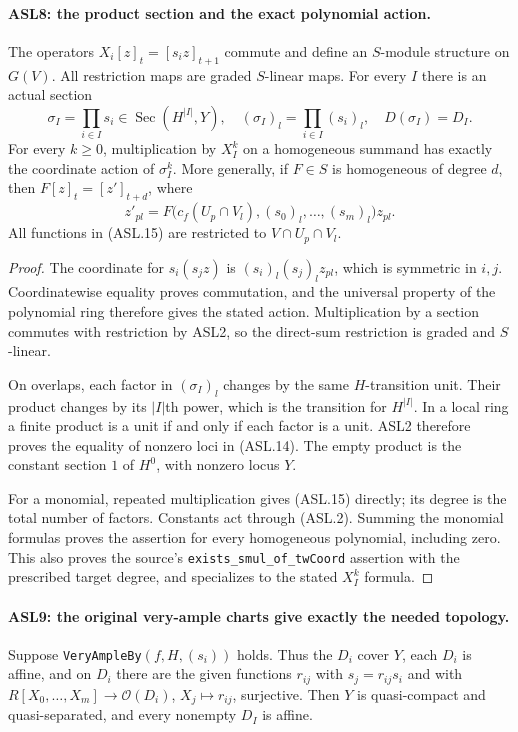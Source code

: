 \documentclass[11pt,a4paper]{article}
\numberwithin{equation}{section}
\theoremstyle{remark}\newtheorem{remark}[theorem]{Remark}
\begin{document}
\paragraph{ASL8: the product section and the exact polynomial action.}
\label{claim:ASL8}
The operators $X_i[z]_t=[s_i z]_{t+1}$ commute and define an
$S$-module structure on $G(V)$.  All restriction maps are graded
$S$-linear maps.  For every $I$ there is an actual section
\[
 \sigma_I=\prod_{i\in I}s_i\in\operatorname{Sec}(H^{|I|},Y),
 \quad (\sigma_I)_l=\prod_{i\in I}(s_i)_l,
 \quad D(\sigma_I)=D_I.                              \tag{ASL.14}
\]
For every $k\ge0$, multiplication by $X_I^k$ on a homogeneous
summand has exactly the coordinate action of $\sigma_I^k$.
More generally, if $F\in S$ is homogeneous of degree $d$, then
$F[z]_t=[z']_{t+d}$, where
\[
 z'_{pl}=F\bigl(c_f(U_p\cap V_l),
                      (s_0)_l,\ldots,(s_m)_l\bigr)z_{pl}.
                                                        \tag{ASL.15}
\]
All functions in (ASL.15) are restricted to $V\cap U_p\cap V_l$.

\begin{proof}
The coordinate for $s_i(s_jz)$ is
$(s_i)_l(s_j)_lz_{pl}$, which is symmetric in $i,j$.
Coordinatewise equality proves commutation, and the universal property
of the polynomial ring therefore gives the stated action.
Multiplication by a section commutes with restriction by ASL2,
so the direct-sum restriction is graded and $S$-linear.

On overlaps, each factor in $(\sigma_I)_l$ changes by the same
$H$-transition unit.  Their product changes by its $|I|$th power,
which is the transition for $H^{|I|}$.  In a local ring a finite
product is a unit if and only if each factor is a unit.  ASL2
therefore proves the equality of nonzero loci in (ASL.14).
The empty product is the constant section $1$ of $H^0$, with
nonzero locus $Y$.

For a monomial, repeated multiplication gives (ASL.15) directly;
its degree is the total number of factors.  Constants act through
(ASL.2).  Summing the monomial formulas proves the assertion for
every homogeneous polynomial, including zero.  This also proves
the source's \texttt{exists\_\allowbreak{}smul\_\allowbreak{}of\_\allowbreak{}tw\allowbreak{}Coord} assertion with
the prescribed target degree, and specializes to the stated
$X_I^k$ formula.
\end{proof}

\paragraph{ASL9: the original very-ample charts give exactly the needed topology.}
\label{claim:ASL9}
Suppose \texttt{Very\allowbreak{}Ample\allowbreak{}By}$(f,H,(s_i))$ holds.  Thus the
$D_i$ cover $Y$, each $D_i$ is affine, and on $D_i$ there are
the given functions $r_{ij}$ with $s_j=r_{ij}s_i$ and with
$R[X_0,\ldots,X_m]\to\mathcal O(D_i)$, $X_j\mapsto r_{ij}$,
surjective.  Then $Y$ is quasi-compact and quasi-separated,
and every nonempty $D_I$ is affine.
\end{document}
